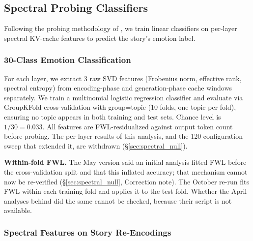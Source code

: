 \subsection{Spectral Probing Classifiers}
\label{sec:spectral_probe_method}

Following the probing methodology of \citet{belinkov2022probing}, we train linear classifiers on per-layer spectral KV-cache features to predict the story's emotion label.

\subsubsection{30-Class Emotion Classification}

For each layer, we extract 3 raw SVD features (Frobenius norm, effective rank, spectral entropy) from encoding-phase and generation-phase cache windows separately. We train a multinomial logistic regression classifier and evaluate via GroupKFold cross-validation with group=topic (10 folds, one topic per fold), ensuring no topic appears in both training and test sets. Chance level is $1/30 = 0.033$. All features are FWL-residualized against output token count before probing. The per-layer results of this analysis, and the 120-configuration sweep that extended it, are withdrawn (\S\ref{sec:spectral_null}).

\textbf{Within-fold FWL.} The May version said an initial analysis fitted FWL before the cross-validation split and that this inflated accuracy; that mechanism cannot now be re-verified (\S\ref{sec:spectral_null}, Correction note). The October re-run fits FWL within each training fold and applies it to the test fold. Whether the April analyses behind  did the same cannot be checked, because their script is not available.

\subsubsection{Spectral Features on Story Re-Encodings}

